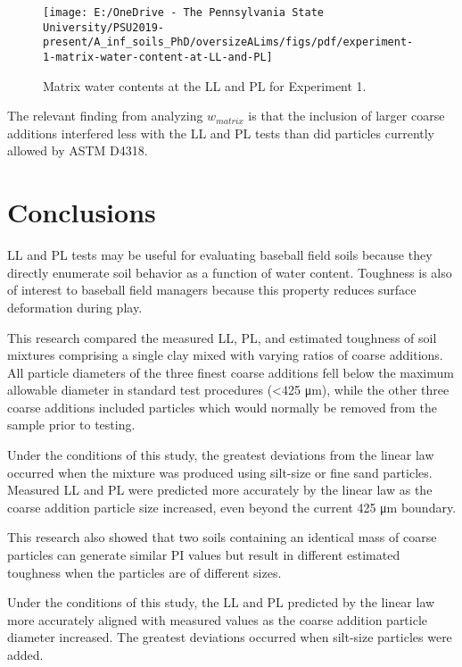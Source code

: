 \documentclass[
  letterpaper,
]{article}
\begin{document}
\begin{figure}

{\centering \texttt{[image: E:/OneDrive - The Pennsylvania State University/PSU2019-present/A\_inf\_soils\_PhD/oversizeALims/figs/pdf/experiment-1-matrix-water-content-at-LL-and-PL]} 

}

\caption{Matrix water contents at the LL and PL for Experiment 1.}\label{fig:experiment-1-matrix-water-content-at-LL-and-PL}
\end{figure}

The relevant finding from analyzing \(w_{matrix}\) is that the
inclusion of larger coarse additions interfered less with the LL and PL tests than did particles currently allowed by ASTM D4318.

\hypertarget{conclusions}{%
\section{Conclusions}\label{conclusions}}

LL and PL tests may be useful for evaluating baseball field soils because they directly enumerate soil behavior as a function of water content.
Toughness is also of interest to baseball field managers because this property reduces surface deformation during play.

This research compared the measured LL, PL, and estimated toughness of soil mixtures comprising a single clay mixed with varying ratios of coarse additions.
All particle diameters of the three finest coarse additions fell below the maximum allowable diameter in standard test procedures (\textless425 μm), while the other three coarse additions included particles which would normally be removed from the sample prior to testing.

Under the conditions of this study, the greatest deviations from the linear law occurred when the mixture was produced using silt-size or fine sand particles. Measured LL and PL were predicted more accurately by the linear law as the coarse addition particle size increased, even beyond the current 425 μm boundary.

This research also showed that two soils containing an identical mass of coarse particles can generate similar PI values but result in different estimated toughness when the particles are of different sizes.

Under the conditions of this study, the LL and PL predicted by the linear law more accurately aligned with measured values as the coarse addition particle diameter increased.
The greatest deviations occurred when silt-size particles were added.
\end{document}
